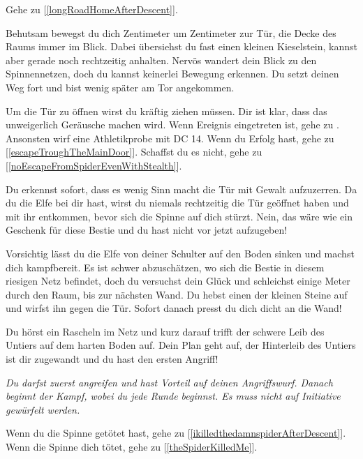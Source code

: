 Gehe zu [\ref{longRoadHomeAfterDescent}].


Behutsam bewegst du dich Zentimeter um Zentimeter zur Tür, die Decke des Raums immer im Blick. Dabei übersiehst du fast einen kleinen Kieselstein, kannst aber gerade noch rechtzeitig anhalten. Nervös wandert dein Blick zu den Spinnennetzen, doch du kannst keinerlei Bewegung erkennen.
Du setzt deinen Weg fort und bist wenig später am Tor angekommen.

Um die Tür zu öffnen wirst du kräftig ziehen müssen. Dir ist klar, dass das unweigerlich Geräusche machen wird.
Wenn Ereignis  eingetreten ist, gehe zu . Ansonsten
wirf eine Athletikprobe mit DC 14. Wenn du Erfolg hast, gehe zu [\ref{escapeTroughTheMainDoor}]. Schaffst du es nicht, gehe zu [\ref{noEscapeFromSpiderEvenWithStealth}].

Du erkennst sofort, dass es wenig Sinn macht die Tür mit Gewalt aufzuzerren. Da du die Elfe bei dir hast, wirst du niemals rechtzeitig die Tür geöffnet haben und mit ihr entkommen, bevor sich die Spinne auf dich stürzt. Nein, das wäre wie ein Geschenk für diese Bestie und du hast nicht vor jetzt aufzugeben!

Vorsichtig lässt du die Elfe von deiner Schulter auf den Boden sinken und machst dich kampfbereit. Es ist schwer abzuschätzen, wo sich die Bestie in diesem riesigen Netz befindet, doch du versuchst dein Glück und schleichst einige Meter durch den Raum, bis zur nächsten Wand. Du hebst einen der kleinen Steine auf und wirfst ihn gegen die Tür. Sofort danach presst du dich dicht an die Wand!

Du hörst ein Rascheln im Netz und kurz darauf trifft der schwere Leib des Untiers auf dem harten Boden auf. Dein Plan geht auf, der Hinterleib des Untiers ist dir zugewandt und du hast den ersten Angriff!

\textit{Du darfst zuerst angreifen und hast Vorteil auf deinen Angriffswurf. Danach beginnt der Kampf, wobei du jede Runde beginnst. Es muss nicht auf Initiative gewürfelt werden.}


Wenn du die Spinne getötet hast, gehe zu [\ref{ikilledthedamnspiderAfterDescent}].
\\Wenn die Spinne dich tötet, gehe zu [\ref{theSpiderKilledMe}].

